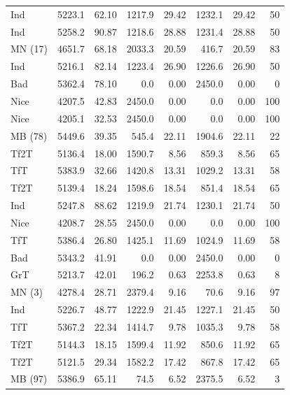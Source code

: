 \documentclass[journal,a4paper,10pt,twoside]{IEEEtran} %
\begin{document}
\begin{table}[ht]
\begin{tabular}{lrrrrrrr}
    	     Ind &   5223.1 & 62.10 &   1217.9 & 29.42 &   1232.1 & 29.42 &    50 \\
    	     Ind &   5258.2 & 90.87 &   1218.6 & 28.88 &   1231.4 & 28.88 &    50 \\
    	 MN (17) &   4651.7 & 68.18 &   2033.3 & 20.59 &    416.7 & 20.59 &    83 \\
    	     Ind &   5216.1 & 82.14 &   1223.4 & 26.90 &   1226.6 & 26.90 &    50 \\
    	     Bad &   5362.4 & 78.10 &      0.0 &  0.00 &   2450.0 &  0.00 &     0 \\
    	    Nice &   4207.5 & 42.83 &   2450.0 &  0.00 &      0.0 &  0.00 &   100 \\
    	    Nice &   4205.1 & 32.53 &   2450.0 &  0.00 &      0.0 &  0.00 &   100 \\
    	 MB (78) &   5449.6 & 39.35 &    545.4 & 22.11 &   1904.6 & 22.11 &    22 \\
    	    Tf2T &   5136.4 & 18.00 &   1590.7 &  8.56 &    859.3 &  8.56 &    65 \\
    	     TfT &   5383.9 & 32.66 &   1420.8 & 13.31 &   1029.2 & 13.31 &    58 \\
    	    Tf2T &   5139.4 & 18.24 &   1598.6 & 18.54 &    851.4 & 18.54 &    65 \\
    	     Ind &   5247.8 & 88.62 &   1219.9 & 21.74 &   1230.1 & 21.74 &    50 \\
    	    Nice &   4208.7 & 28.55 &   2450.0 &  0.00 &      0.0 &  0.00 &   100 \\
    	     TfT &   5386.4 & 26.80 &   1425.1 & 11.69 &   1024.9 & 11.69 &    58 \\
    	     Bad &   5343.2 & 41.91 &      0.0 &  0.00 &   2450.0 &  0.00 &     0 \\
    	     GrT &   5213.7 & 42.01 &    196.2 &  0.63 &   2253.8 &  0.63 &     8 \\
    	  MN (3) &   4278.4 & 28.71 &   2379.4 &  9.16 &     70.6 &  9.16 &    97 \\
    	     Ind &   5226.7 & 48.77 &   1222.9 & 21.45 &   1227.1 & 21.45 &    50 \\
    	     TfT &   5367.2 & 22.34 &   1414.7 &  9.78 &   1035.3 &  9.78 &    58 \\
    	    Tf2T &   5144.3 & 18.15 &   1599.4 & 11.92 &    850.6 & 11.92 &    65 \\
    	    Tf2T &   5121.5 & 29.34 &   1582.2 & 17.42 &    867.8 & 17.42 &    65 \\
    	 MB (97) &   5386.9 & 65.11 &     74.5 &  6.52 &   2375.5 &  6.52 &     3 \\

\end{tabular}
\end{table}
\end{document}
